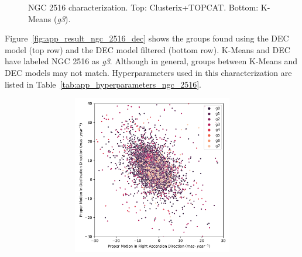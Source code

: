 \documentclass[11pt,a4paper,english,twocolumn]{article}
\begin{document}
\begin{figure}[htbp]
\begin{subfigure}{\columnwidth}
\begin{subfigure}[t]{0.30\textwidth}
    \end{subfigure}
  \end{subfigure}
  \caption{NGC 2516 characterization.
           Top: Clusterix+TOPCAT. Bottom: K-Means (\emph{g3}).}
  \label{fig:app_result_ngc_2516_clusterix_kmeans}
\end{figure}

Figure~\ref{fig:app_result_ngc_2516_dec} shows the groups found using the
DEC model (top row) and the DEC model filtered (bottom row).
K-Means and DEC have labeled NGC 2516 as \emph{g3}. Although in general,
groups between K-Means and DEC models may not match.
Hyperparameters used in this characterization are listed in
Table~\ref{tab:app_hyperparameters_ngc_2516}.

\begin{figure}[htbp]
  \centering
  \begin{subfigure}{\columnwidth}
    \centering
    \begin{subfigure}[t]{0.30\textwidth}
      \centering
      \includegraphics[width=\textwidth]{../figures/ngc_2516/dec_pm_ngc_2516.png}
    \end{subfigure}
    \hfill
    \begin{subfigure}[t]{0.30\textwidth}
      \centering

\end{subfigure}
\end{subfigure}
\end{figure}
\end{document}
